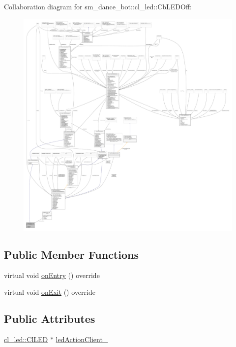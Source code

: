 Collaboration diagram for sm\+\_\+dance\+\_\+bot\+:\+:cl\+\_\+led\+:\+:Cb\+L\+E\+D\+Off\+:
\nopagebreak
\begin{figure}[H]
\begin{center}
\leavevmode
\includegraphics[width=350pt]{classsm__dance__bot_1_1cl__led_1_1CbLEDOff__coll__graph}
\end{center}
\end{figure}
\subsection*{Public Member Functions}
\begin{DoxyCompactItemize}
\item 
virtual void \hyperlink{classsm__dance__bot_1_1cl__led_1_1CbLEDOff_a3c0ed097db52baae1928a19936f09a83}{on\+Entry} () override
\item 
virtual void \hyperlink{classsm__dance__bot_1_1cl__led_1_1CbLEDOff_ad0db28985308dd486943d1f511c655ad}{on\+Exit} () override
\end{DoxyCompactItemize}
\subsection*{Public Attributes}
\begin{DoxyCompactItemize}
\item 
\hyperlink{classsm__dance__bot_1_1cl__led_1_1ClLED}{cl\+\_\+led\+::\+Cl\+L\+ED} $\ast$ \hyperlink{classsm__dance__bot_1_1cl__led_1_1CbLEDOff_a338a86c573b1b9c9cc4af9459145d68e}{led\+Action\+Client\+\_\+}
\end{DoxyCompactItemize}
